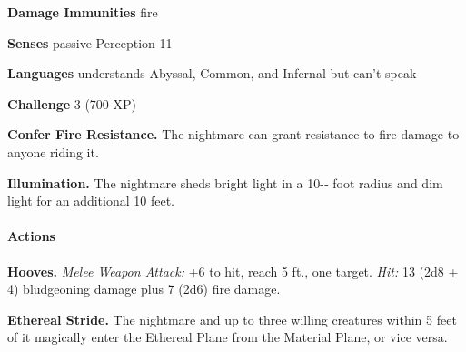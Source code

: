 \documentclass[
]{article}
\begin{document}
\textbf{Damage Immunities} fire

\textbf{Senses} passive Perception 11

\textbf{Languages} understands Abyssal, Common, and Infernal but can't
speak

\textbf{Challenge} 3 (700 XP)

\textbf{Confer Fire Resistance.} The nightmare can grant resistance to
fire damage to anyone riding it.

\textbf{Illumination.} The nightmare sheds bright light in a 10-­‐ foot
radius and dim light for an additional 10 feet.

\hypertarget{actions-2}{%
\paragraph{Actions}\label{actions-2}}

\textbf{Hooves.} \emph{Melee Weapon Attack:} +6 to hit, reach 5 ft., one
target. \emph{Hit:} 13 (2d8 + 4) bludgeoning damage plus 7 (2d6) fire
damage.

\textbf{Ethereal Stride.} The nightmare and up to three willing
creatures within 5 feet of it magically enter the Ethereal Plane from
the Material Plane, or vice versa.
\end{document}
